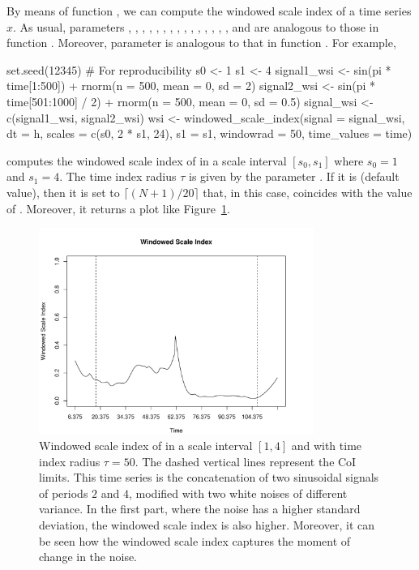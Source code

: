 By means of function , we can compute the windowed scale index of a time series $x$. As usual, parameters , , , , , , , , , , , , , , ,  and  are analogous to those in function . Moreover, parameter  is analogous to that in function . For example,
\begin{example}
set.seed(12345) # For reproducibility
s0 <- 1
s1 <- 4
signal1_wsi <- sin(pi * time[1:500]) + rnorm(n = 500, mean = 0, sd = 2)
signal2_wsi <- sin(pi * time[501:1000] / 2) + rnorm(n = 500, mean = 0, sd = 0.5)
signal_wsi <- c(signal1_wsi, signal2_wsi)
wsi <- windowed_scale_index(signal = signal_wsi, dt = h,
                            scales = c(s0, 2 * s1, 24), s1 = s1,
                            windowrad = 50,
                            time_values = time)
\end{example}
computes the windowed scale index of  in a scale interval $\left[ s_0,s_1\right] $ where $s_0=1$ and $s_1=4$. The time index radius $\tau$ is given by the parameter . If it is  (default value), then it is set to $\lceil (N+1)/20\rceil $ that, in this case, coincides with the value of . Moreover, it returns a plot like Figure~\ref{fig:wsidx4}.

\begin{figure}[tbp]
\begin{center}
  \includegraphics[width=0.8\textwidth]{Figure10}
\end{center}
\caption{Windowed scale index of  in a scale interval $\left[ 1,4\right] $ and with time index radius $\tau =50$. The dashed vertical lines represent the CoI limits. This time series is the concatenation of two sinusoidal signals of periods $2$ and $4$, modified with two white noises of different variance. In the first part, where the noise has a higher standard deviation, the windowed scale index is also higher. Moreover, it can be seen how the windowed scale index captures the moment of change in the noise.}
\label{fig:wsidx4}
\end{figure}


